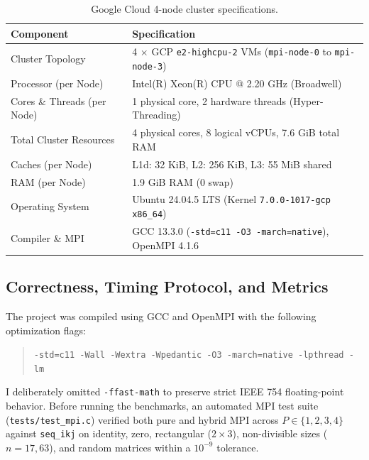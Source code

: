 \documentclass[11pt,a4paper]{article}
\begin{document}
\begin{table}[h!]
\centering
\small
\begin{tabular}{ll}
\toprule
\textbf{Component} & \textbf{Specification} \\
\midrule
Cluster Topology & 4 $\times$ GCP \texttt{e2-highcpu-2} VMs (\texttt{mpi-node-0} to \texttt{mpi-node-3}) \\
Processor (per Node) & Intel(R) Xeon(R) CPU @ 2.20 GHz (Broadwell) \\
Cores \& Threads (per Node) & 1 physical core, 2 hardware threads (Hyper-Threading) \\
Total Cluster Resources & 4 physical cores, 8 logical vCPUs, 7.6 GiB total RAM \\
Caches (per Node) & L1d: 32 KiB, L2: 256 KiB, L3: 55 MiB shared \\
RAM (per Node) & 1.9 GiB RAM (0 swap) \\
Operating System & Ubuntu 24.04.5 LTS (Kernel \texttt{7.0.0-1017-gcp x86\_64}) \\
Compiler \& MPI & GCC 13.3.0 (\texttt{-std=c11 -O3 -march=native}), OpenMPI 4.1.6 \\
\bottomrule
\end{tabular}
\caption{Google Cloud 4-node cluster specifications.}
\label{tab:hardware}
\end{table}

\subsection{Correctness, Timing Protocol, and Metrics}
The project was compiled using GCC and OpenMPI with the following optimization flags:
\begin{quote}
\texttt{-std=c11 -Wall -Wextra -Wpedantic -O3 -march=native -lpthread -lm}
\end{quote}
I deliberately omitted \texttt{-ffast-math} to preserve strict IEEE 754 floating-point behavior. Before running the benchmarks, an automated MPI test suite (\texttt{tests/test\_mpi.c}) verified both pure and hybrid MPI across $P \in \{1, 2, 3, 4\}$ against \texttt{seq\_ikj} on identity, zero, rectangular ($2 \times 3$), non-divisible sizes ($n = 17, 63$), and random matrices within a $10^{-9}$ tolerance.
\end{document}
